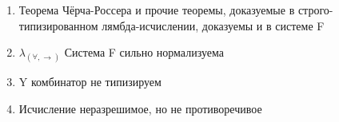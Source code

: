  	
    \begin{enumerate}
        \item Теорема Чёрча-Россера и прочие теоремы, доказуемые в строго-типизированном лямбда-исчислении, доказуемы и в системе F
 	    \item $\lambda_{(\forall, \rightarrow)}$ Система F сильно нормализуема
 	    \item Y комбинатор не типизируем
	    \item Исчисление неразрешимое, но не противоречивое
    \end{enumerate}
